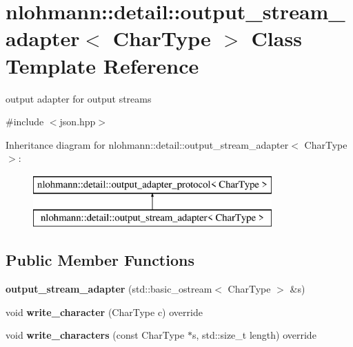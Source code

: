 \hypertarget{classnlohmann_1_1detail_1_1output__stream__adapter}{}\section{nlohmann\+:\+:detail\+:\+:output\+\_\+stream\+\_\+adapter$<$ Char\+Type $>$ Class Template Reference}
\label{classnlohmann_1_1detail_1_1output__stream__adapter}


output adapter for output streams  




{\ttfamily \#include $<$json.\+hpp$>$}

Inheritance diagram for nlohmann\+:\+:detail\+:\+:output\+\_\+stream\+\_\+adapter$<$ Char\+Type $>$\+:\begin{figure}[H]
\begin{center}
\leavevmode
\includegraphics[height=2.000000cm]{d8/d94/classnlohmann_1_1detail_1_1output__stream__adapter}
\end{center}
\end{figure}
\subsection*{Public Member Functions}
\begin{DoxyCompactItemize}
\item 
\mbox{\label{classnlohmann_1_1detail_1_1output__stream__adapter_a4e78a9bd19cbf3a4191adc62d14f0055}} 
{\bfseries output\+\_\+stream\+\_\+adapter} (std\+::basic\+\_\+ostream$<$ Char\+Type $>$ \&s)
\item 
\mbox{\label{classnlohmann_1_1detail_1_1output__stream__adapter_a6e2698c76b200b2d8fac6cebfc43a245}} 
void {\bfseries write\+\_\+character} (Char\+Type c) override
\item 
\mbox{\label{classnlohmann_1_1detail_1_1output__stream__adapter_ad61375497a7d03cb0bdcddfdaad185d0}} 
void {\bfseries write\+\_\+characters} (const Char\+Type $\ast$s, std\+::size\+\_\+t length) override
\end{DoxyCompactItemize}


